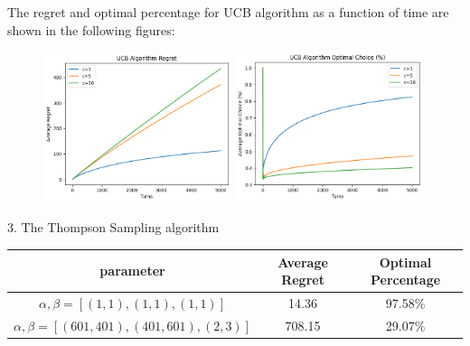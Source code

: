 The regret and optimal percentage for UCB algorithm as a function of time are shown in the following figures:
\begin{figure}[h]
    \centering
    \includegraphics[width=0.49\textwidth]{./figure/UCB_regret.png}
    \includegraphics[width=0.49\textwidth]{./figure/UCB_optimal.png}
\end{figure}


3. The Thompson Sampling algorithm
\begin{table}[!htbp]
    \centering
    \begin{tabular}{c c c}
    \toprule
    parameter & Average Regret & Optimal Percentage \\
    \midrule
    $\alpha,\beta=[(1,1),(1,1),(1,1)]$         & 14.36  & 97.58\% \\
    $\alpha,\beta=[(601,401),(401,601),(2,3)]$ & 708.15 & 29.07\% \\
    \bottomrule
\end{tabular}
\end{table}

